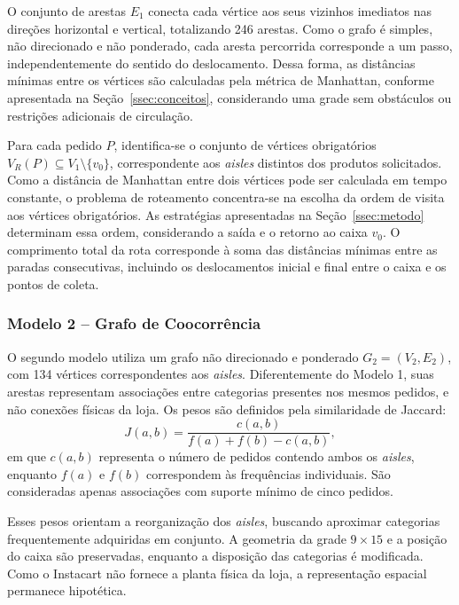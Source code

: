 O conjunto de arestas $E_1$ conecta cada vértice aos seus vizinhos imediatos nas direções horizontal e vertical, totalizando 246 arestas. Como o grafo é simples, não direcionado e não ponderado, cada aresta percorrida corresponde a um passo, independentemente do sentido do deslocamento. Dessa forma, as distâncias mínimas entre os vértices são calculadas pela métrica de Manhattan, conforme apresentada na Seção~\ref{ssec:conceitos}, considerando uma grade sem obstáculos ou restrições adicionais de circulação.

Para cada pedido $P$, identifica-se o conjunto de vértices obrigatórios $V_R(P) \subseteq V_1 \setminus \{v_0\}$, correspondente aos \textit{aisles} distintos dos produtos solicitados. Como a distância de Manhattan entre dois vértices pode ser calculada em tempo constante, o problema de roteamento concentra-se na escolha da ordem de visita aos vértices obrigatórios. As estratégias apresentadas na Seção~\ref{ssec:metodo} determinam essa ordem, considerando a saída e o retorno ao caixa $v_0$. O comprimento total da rota corresponde à soma das distâncias mínimas entre as paradas consecutivas, incluindo os deslocamentos inicial e final entre o caixa e os pontos de coleta.

\subsubsection*{Modelo 2 -- Grafo de Coocorrência}

O segundo modelo utiliza um grafo não direcionado e ponderado $G_2 = (V_2, E_2)$, com 134 vértices correspondentes aos \textit{aisles}. Diferentemente do Modelo 1, suas arestas representam associações entre categorias presentes nos mesmos pedidos, e não conexões físicas da loja. Os pesos são definidos pela similaridade de Jaccard:
\begin{equation}
J(a,b) = \frac{c(a,b)}{f(a) + f(b) - c(a,b)},
\label{eq:jaccard}
\end{equation}
em que $c(a,b)$ representa o número de pedidos contendo ambos os \textit{aisles}, enquanto $f(a)$ e $f(b)$ correspondem às frequências individuais. São consideradas apenas associações com suporte mínimo de cinco pedidos.

Esses pesos orientam a reorganização dos \textit{aisles}, buscando aproximar categorias frequentemente adquiridas em conjunto. A geometria da grade $9 \times 15$ e a posição do caixa são preservadas, enquanto a disposição das categorias é modificada. Como o Instacart não fornece a planta física da loja, a representação espacial permanece hipotética.

